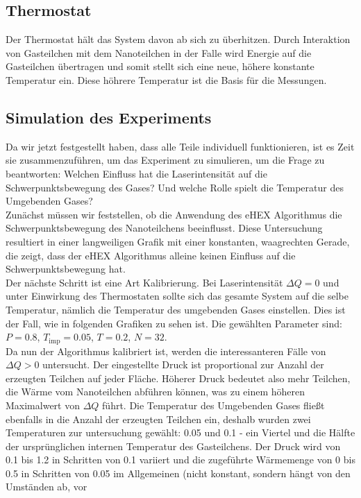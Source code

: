 \documentclass[12pt]{article}
\begin{document}
\subsection{Thermostat}
Der Thermostat hält das System davon ab sich zu überhitzen. Durch Interaktion von Gasteilchen mit dem Nanoteilchen in der Falle
wird Energie auf die Gasteilchen übertragen und somit stellt sich eine neue, höhere konstante Temperatur ein. Diese höhrere
Temperatur ist die Basis für die Messungen.


\subsection{Simulation des Experiments}
Da wir jetzt festgestellt haben, dass alle Teile individuell funktionieren, ist es Zeit sie zusammenzuführen, um das Experiment zu 
simulieren, um die Frage zu beantworten: Welchen Einfluss hat die Laserintensität auf die Schwerpunktsbewegung des Gases? Und welche 
Rolle spielt die Temperatur des Umgebenden Gases?\\
Zunächst müssen wir feststellen, ob die Anwendung des eHEX Algorithmus die Schwerpunktsbewegung des Nanoteilchens beeinflusst. Diese Untersuchung
resultiert in einer langweiligen Grafik mit einer konstanten, waagrechten Gerade, die zeigt, dass der eHEX Algorithmus alleine keinen 
Einfluss auf die Schwerpunktsbewegung hat.\\
Der nächste Schritt ist eine Art Kalibrierung. Bei Laserintensität $\Delta Q = 0$ und unter Einwirkung des Thermostaten sollte sich das
gesamte System auf die selbe Temperatur, nämlich die Temperatur des umgebenden Gases einstellen. Dies ist der Fall, wie in 
folgenden Grafiken zu sehen ist. Die gewählten Parameter sind: $P=0.8$, $T_\text{imp} = 0.05$, $T = 0.2$, $N=32$.\\
Da nun der Algorithmus kalibriert ist, werden die interessanteren Fälle von $\Delta Q > 0$ untersucht. Der eingestellte Druck 
ist proportional zur Anzahl der erzeugten Teilchen auf jeder Fläche. Höherer Druck bedeutet also mehr Teilchen, die Wärme vom 
Nanoteilchen abführen können, was zu einem höheren Maximalwert von $\Delta Q$ führt. Die Temperatur des Umgebenden Gases fließt ebenfalls 
in die Anzahl der erzeugten Teilchen ein, deshalb wurden zwei Temperaturen zur untersuchung gewählt: 0.05 und 0.1 - ein Viertel und die 
Hälfte der ursprünglichen internen Temperatur des Gasteilchens. Der Druck wird von 0.1 bis 1.2 in Schritten von 0.1 variiert und die 
zugeführte Wärmemenge von 0 bis 0.5 in Schritten von 0.05 im Allgemeinen (nicht konstant, sondern hängt von den Umständen ab, vor 
\end{document}
